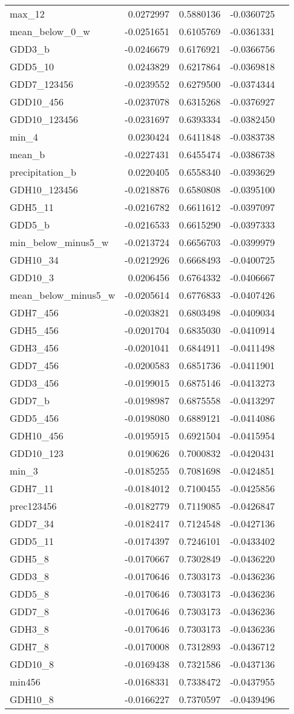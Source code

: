\documentclass[]{article}
\begin{document}
\begin{longtable}[]{@{}lrrrl@{}}
max\_12 & 0.0272997 & 0.5880136 & -0.0360725 &\tabularnewline
mean\_below\_0\_w & -0.0251651 & 0.6105769 & -0.0361331 &\tabularnewline
GDD3\_b & -0.0246679 & 0.6176921 & -0.0366756 &\tabularnewline
GDD5\_10 & 0.0243829 & 0.6217864 & -0.0369818 &\tabularnewline
GDD7\_123456 & -0.0239552 & 0.6279500 & -0.0374344 &\tabularnewline
GDD10\_456 & -0.0237078 & 0.6315268 & -0.0376927 &\tabularnewline
GDD10\_123456 & -0.0231697 & 0.6393334 & -0.0382450 &\tabularnewline
min\_4 & 0.0230424 & 0.6411848 & -0.0383738 &\tabularnewline
mean\_b & -0.0227431 & 0.6455474 & -0.0386738 &\tabularnewline
precipitation\_b & 0.0220405 & 0.6558340 & -0.0393629 &\tabularnewline
GDH10\_123456 & -0.0218876 & 0.6580808 & -0.0395100 &\tabularnewline
GDH5\_11 & -0.0216782 & 0.6611612 & -0.0397097 &\tabularnewline
GDD5\_b & -0.0216533 & 0.6615290 & -0.0397333 &\tabularnewline
min\_below\_minus5\_w & -0.0213724 & 0.6656703 & -0.0399979
&\tabularnewline
GDH10\_34 & -0.0212926 & 0.6668493 & -0.0400725 &\tabularnewline
GDD10\_3 & 0.0206456 & 0.6764332 & -0.0406667 &\tabularnewline
mean\_below\_minus5\_w & -0.0205614 & 0.6776833 & -0.0407426
&\tabularnewline
GDH7\_456 & -0.0203821 & 0.6803498 & -0.0409034 &\tabularnewline
GDH5\_456 & -0.0201704 & 0.6835030 & -0.0410914 &\tabularnewline
GDH3\_456 & -0.0201041 & 0.6844911 & -0.0411498 &\tabularnewline
GDD7\_456 & -0.0200583 & 0.6851736 & -0.0411901 &\tabularnewline
GDD3\_456 & -0.0199015 & 0.6875146 & -0.0413273 &\tabularnewline
GDD7\_b & -0.0198987 & 0.6875558 & -0.0413297 &\tabularnewline
GDD5\_456 & -0.0198080 & 0.6889121 & -0.0414086 &\tabularnewline
GDH10\_456 & -0.0195915 & 0.6921504 & -0.0415954 &\tabularnewline
GDD10\_123 & 0.0190626 & 0.7000832 & -0.0420431 &\tabularnewline
min\_3 & -0.0185255 & 0.7081698 & -0.0424851 &\tabularnewline
GDH7\_11 & -0.0184012 & 0.7100455 & -0.0425856 &\tabularnewline
prec123456 & -0.0182779 & 0.7119085 & -0.0426847 &\tabularnewline
GDD7\_34 & -0.0182417 & 0.7124548 & -0.0427136 &\tabularnewline
GDD5\_11 & -0.0174397 & 0.7246101 & -0.0433402 &\tabularnewline
GDH5\_8 & -0.0170667 & 0.7302849 & -0.0436220 &\tabularnewline
GDD3\_8 & -0.0170646 & 0.7303173 & -0.0436236 &\tabularnewline
GDD5\_8 & -0.0170646 & 0.7303173 & -0.0436236 &\tabularnewline
GDD7\_8 & -0.0170646 & 0.7303173 & -0.0436236 &\tabularnewline
GDH3\_8 & -0.0170646 & 0.7303173 & -0.0436236 &\tabularnewline
GDH7\_8 & -0.0170008 & 0.7312893 & -0.0436712 &\tabularnewline
GDD10\_8 & -0.0169438 & 0.7321586 & -0.0437136 &\tabularnewline
min456 & -0.0168331 & 0.7338472 & -0.0437955 &\tabularnewline
GDH10\_8 & -0.0166227 & 0.7370597 & -0.0439496 &\tabularnewline

\end{longtable}
\end{document}
